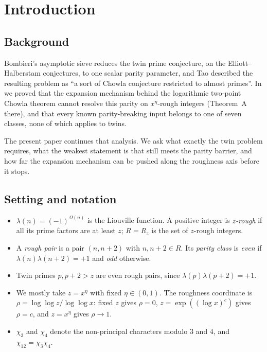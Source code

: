 \documentclass[11pt]{amsart}
\theoremstyle{definition}
\theoremstyle{remark}
\begin{document}
\tableofcontents

\section{Introduction}

\subsection{Background}
Bombieri's asymptotic sieve \cite{Bom76,FI78} reduces the twin prime conjecture, on the Elliott--Halberstam conjectures, to one scalar parity parameter, and Tao \cite{Tao16notes} described the resulting problem as ``a sort of Chowla conjecture restricted to almost primes''. In \cite{Wan26b} we proved that the expansion mechanism behind the logarithmic two-point Chowla theorem \cite{Tao16,HR21,Pil23} cannot resolve this parity on $x^\eta$-rough integers (Theorem~A there), and that every known parity-breaking input belongs to one of seven classes, none of which applies to twins.

The present paper continues that analysis. We ask what exactly the twin problem requires, what the weakest statement is that still meets the parity barrier, and how far the expansion mechanism can be pushed along the roughness axis before it stops.

\subsection{Setting and notation}
\begin{itemize}
\item $\lambda(n)=(-1)^{\Omega(n)}$ is the Liouville function. A positive integer is \emph{$z$-rough} if all its prime factors are at least $z$; $R=R_z$ is the set of $z$-rough integers.
\item A \emph{rough pair} is a pair $(n,n+2)$ with $n,n+2\in R$. Its \emph{parity class} is \emph{even} if $\lambda(n)\lambda(n+2)=+1$ and \emph{odd} otherwise.
\item Twin primes $p,p+2>z$ are even rough pairs, since $\lambda(p)\lambda(p+2)=+1$.
\item We mostly take $z=x^\eta$ with fixed $\eta\in(0,1)$. The roughness coordinate is $\rho=\log\log z/\log\log x$: fixed $z$ gives $\rho=0$, $z=\exp((\log x)^c)$ gives $\rho=c$, and $z=x^\eta$ gives $\rho\to1$.
\item $\chi_3$ and $\chi_4$ denote the non-principal characters modulo $3$ and $4$, and $\chi_{12}=\chi_3\chi_4$.
\end{itemize}
\end{document}
